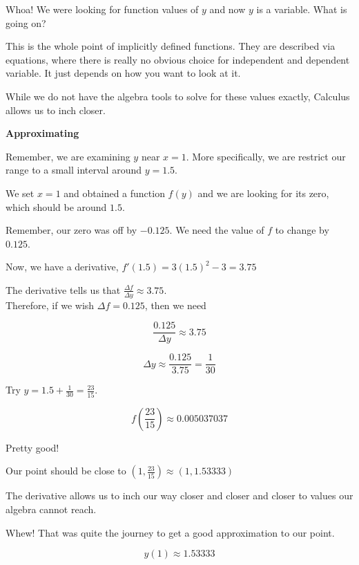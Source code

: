 \documentclass{ximera}
\begin{document}
Whoa!  We were looking for function values of $y$ and now $y$ is a variable.  What is going on?

This is the whole point of implicitly defined functions.  They are described via equations, where there is really no obvious choice for independent and dependent variable.  It just depends on how you want to look at it.




While we do not have the algebra tools to solve for these values exactly, Calculus allows us to inch closer.



\begin{explanation} \textbf{\textcolor{red!75!green}{Approximating}} 


Remember, we are examining $y$ near $x = 1$.   More specifically, we are restrict our range to a small interval around $y = 1.5$.  

We set $x = 1$ and obtained a function $f(y)$ and we are looking for its zero, which should be around $1.5$.


Remember, our zero was off by $-0.125$.  We need the value of $f$ to change by $0.125$.


Now, we have a derivative, $f'(1.5) = 3 (1.5)^2 - 3 = 3.75$


The derivative tells us that $\frac{\Delta f}{\Delta y} \approx 3.75$. \\

Therefore, if we wish $\Delta f = 0.125$, then we need 



\[
\frac{0.125}{\Delta y} \approx 3.75
\]


\[
\Delta y \approx \frac{0.125}{3.75} = \frac{1}{30}
\]


Try $y = 1.5 + \frac{1}{30} = \frac{23}{15}$.


\[  f\left( \frac{23}{15} \right) \approx 0.005037037 \]


Pretty good!


Our point should be close to $\left(1, \frac{23}{15} \right) \approx (1, 1.53333)$


The derivative allows us to inch our way closer and closer and closer to values our algebra cannot reach.

\end{explanation}



Whew!  That was quite the journey to get a good approximation to our point.

\[ y(1) \approx 1.53333   \]
\end{document}
